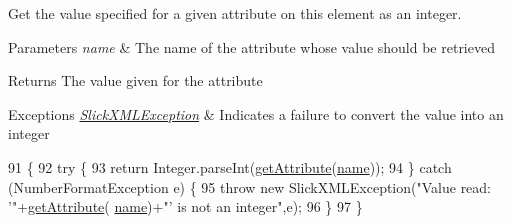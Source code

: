 Get the value specified for a given attribute on this element as an integer.


\begin{DoxyParams}{Parameters}
{\em name} & The name of the attribute whose value should be retrieved \\
\hline
\end{DoxyParams}
\begin{DoxyReturn}{Returns}
The value given for the attribute 
\end{DoxyReturn}

\begin{DoxyExceptions}{Exceptions}
{\em \mbox{\hyperlink{classorg_1_1newdawn_1_1slick_1_1util_1_1xml_1_1_slick_x_m_l_exception}{Slick\+X\+M\+L\+Exception}}} & Indicates a failure to convert the value into an integer \\
\hline
\end{DoxyExceptions}

\begin{DoxyCode}
91                                                                      \{
92         \textcolor{keywordflow}{try} \{
93             \textcolor{keywordflow}{return} Integer.parseInt(\mbox{\hyperlink{classorg_1_1newdawn_1_1slick_1_1util_1_1xml_1_1_x_m_l_element_a49543d209f2f2709c8e7a88fac034c69}{getAttribute}}(\mbox{\hyperlink{classorg_1_1newdawn_1_1slick_1_1util_1_1xml_1_1_x_m_l_element_aa96123a88e2614952c4d3d1a4207560a}{name}}));
94         \} \textcolor{keywordflow}{catch} (NumberFormatException e) \{
95             \textcolor{keywordflow}{throw} \textcolor{keyword}{new} SlickXMLException(\textcolor{stringliteral}{"Value read: '"}+\mbox{\hyperlink{classorg_1_1newdawn_1_1slick_1_1util_1_1xml_1_1_x_m_l_element_a49543d209f2f2709c8e7a88fac034c69}{getAttribute}}(
      \mbox{\hyperlink{classorg_1_1newdawn_1_1slick_1_1util_1_1xml_1_1_x_m_l_element_aa96123a88e2614952c4d3d1a4207560a}{name}})+\textcolor{stringliteral}{"' is not an integer"},e);
96         \}
97     \}
\end{DoxyCode}
\mbox{\label{classorg_1_1newdawn_1_1slick_1_1util_1_1xml_1_1_x_m_l_element_a57b900455b819890ab599fb2ac526aa9}} 
